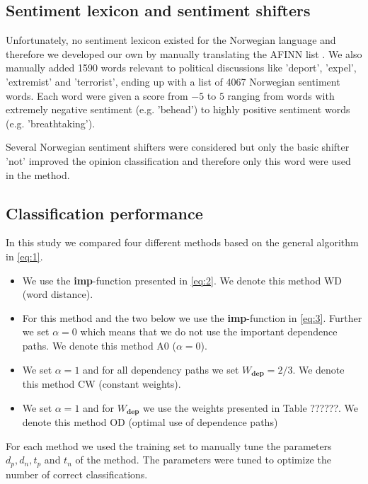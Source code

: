 \documentclass[11pt]{article}
\begin{document}
\subsection{Sentiment lexicon and sentiment shifters}

Unfortunately, no sentiment lexicon existed for the Norwegian language and therefore we developed our own by manually translating the AFINN list \cite{Nielsen11}. We also manually added 1590 words relevant to political discussions  like 'deport', 'expel', 'extremist' and 'terrorist', ending up with a list of 4067 Norwegian sentiment words. Each word were given a score from $-5$ to $5$ ranging from words with extremely negative sentiment (e.g. 'behead') to highly positive sentiment words (e.g. 'breathtaking').

Several Norwegian sentiment shifters were considered but only the basic shifter 'not' improved the opinion classification and therefore only this word were used in the method.

\subsection{Classification performance}

In this study we compared four different methods based on the general algorithm in \eqref{eq:1}.
\begin{itemize}
\item We use the \textbf{imp}-function presented in \eqref{eq:2}. We denote this method WD (word distance).
\item For this method and the two below we use the \textbf{imp}-function in \eqref{eq:3}. Further we set $\alpha = 0$ which means that we do not use the important dependence paths. We denote this method A0 ($\alpha = 0$).
\item We set $\alpha = 1$ and for all dependency paths we set $W_{\mathbf{dep}} = 2/3$. We denote this method CW (constant weights).
\item We set $\alpha = 1$ and for $W_{\mathbf{dep}}$ we use the weights presented in Table ??????. We denote this method OD (optimal use of dependence paths)
\end{itemize}
For each method we used the training set to manually tune the parameters $d_p, d_n, t_p$ and $t_n$ of the method. The parameters were tuned to optimize the number of correct classifications.
\end{document}
